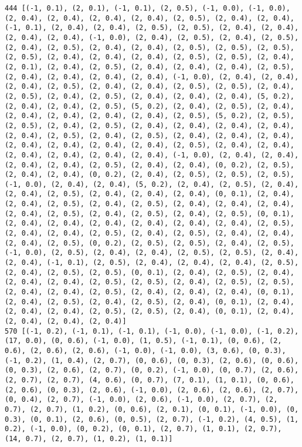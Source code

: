 \documentclass[11pt]{article}
\begin{document}
\begin{Verbatim}[commandchars=\\\{\}]
444 [(-1, 0.1), (2, 0.1), (-1, 0.1), (2, 0.5), (-1, 0.0), (-1, 0.0), (2, 0.4), (2, 0.4), (2, 0.4), (2, 0.4), (2, 0.5), (2, 0.4), (2, 0.4), (-1, 0.1), (2, 0.4), (2, 0.4), (2, 0.5), (2, 0.5), (2, 0.4), (2, 0.4), (2, 0.4), (2, 0.4), (-1, 0.0), (2, 0.4), (2, 0.5), (2, 0.4), (2, 0.5), (2, 0.4), (2, 0.5), (2, 0.4), (2, 0.4), (2, 0.5), (2, 0.5), (2, 0.5), (2, 0.5), (2, 0.4), (2, 0.4), (2, 0.4), (2, 0.5), (2, 0.5), (2, 0.4), (2, 0.1), (2, 0.4), (2, 0.5), (2, 0.4), (2, 0.4), (2, 0.4), (2, 0.5), (2, 0.4), (2, 0.4), (2, 0.4), (2, 0.4), (-1, 0.0), (2, 0.4), (2, 0.4), (2, 0.4), (2, 0.5), (2, 0.4), (2, 0.4), (2, 0.5), (2, 0.5), (2, 0.4), (2, 0.5), (2, 0.4), (2, 0.5), (2, 0.4), (2, 0.4), (2, 0.4), (5, 0.2), (2, 0.4), (2, 0.4), (2, 0.5), (5, 0.2), (2, 0.4), (2, 0.5), (2, 0.4), (2, 0.4), (2, 0.4), (2, 0.4), (2, 0.4), (2, 0.5), (5, 0.2), (2, 0.5), (2, 0.5), (2, 0.4), (2, 0.5), (2, 0.4), (2, 0.4), (2, 0.4), (2, 0.4), (2, 0.4), (2, 0.5), (2, 0.4), (2, 0.5), (2, 0.4), (2, 0.4), (2, 0.4), (2, 0.4), (2, 0.4), (2, 0.4), (2, 0.4), (2, 0.5), (2, 0.4), (2, 0.4), (2, 0.4), (2, 0.4), (2, 0.4), (2, 0.4), (-1, 0.0), (2, 0.4), (2, 0.4), (2, 0.4), (2, 0.4), (2, 0.5), (2, 0.4), (2, 0.4), (0, 0.2), (2, 0.5), (2, 0.4), (2, 0.4), (0, 0.2), (2, 0.4), (2, 0.5), (2, 0.5), (2, 0.5), (-1, 0.0), (2, 0.4), (2, 0.4), (5, 0.2), (2, 0.4), (2, 0.5), (2, 0.4), (2, 0.4), (2, 0.5), (2, 0.4), (2, 0.4), (2, 0.4), (0, 0.1), (2, 0.4), (2, 0.4), (2, 0.5), (2, 0.4), (2, 0.5), (2, 0.4), (2, 0.4), (2, 0.4), (2, 0.4), (2, 0.5), (2, 0.4), (2, 0.5), (2, 0.4), (2, 0.5), (0, 0.1), (2, 0.4), (2, 0.4), (2, 0.4), (2, 0.4), (2, 0.4), (2, 0.4), (2, 0.5), (2, 0.4), (2, 0.4), (2, 0.5), (2, 0.4), (2, 0.5), (2, 0.4), (2, 0.4), (2, 0.4), (2, 0.5), (0, 0.2), (2, 0.5), (2, 0.5), (2, 0.4), (2, 0.5), (-1, 0.0), (2, 0.5), (2, 0.4), (2, 0.4), (2, 0.5), (2, 0.5), (2, 0.4), (2, 0.4), (-1, 0.1), (2, 0.5), (2, 0.4), (2, 0.4), (2, 0.4), (2, 0.5), (2, 0.4), (2, 0.5), (2, 0.5), (0, 0.1), (2, 0.4), (2, 0.5), (2, 0.4), (2, 0.4), (2, 0.4), (2, 0.5), (2, 0.5), (2, 0.4), (2, 0.5), (2, 0.5), (2, 0.4), (2, 0.4), (2, 0.5), (2, 0.4), (2, 0.4), (2, 0.4), (0, 0.1), (2, 0.4), (2, 0.5), (2, 0.4), (2, 0.5), (2, 0.4), (0, 0.1), (2, 0.4), (2, 0.4), (2, 0.4), (2, 0.5), (2, 0.5), (2, 0.4), (0, 0.1), (2, 0.4), (2, 0.4), (2, 0.4), (2, 0.4)]
570 [(-1, 0.2), (-1, 0.1), (-1, 0.1), (-1, 0.0), (-1, 0.0), (-1, 0.2), (17, 0.0), (0, 0.6), (-1, 0.0), (1, 0.5), (-1, 0.1), (0, 0.6), (2, 0.6), (2, 0.6), (2, 0.6), (-1, 0.0), (-1, 0.0), (3, 0.6), (0, 0.3), (-1, 0.2), (1, 0.4), (2, 0.7), (0, 0.6), (0, 0.3), (2, 0.6), (0, 0.6), (0, 0.3), (2, 0.6), (2, 0.7), (0, 0.2), (-1, 0.0), (0, 0.7), (2, 0.6), (2, 0.7), (2, 0.7), (4, 0.6), (0, 0.7), (7, 0.1), (1, 0.1), (0, 0.6), (2, 0.6), (0, 0.3), (2, 0.6), (-1, 0.0), (2, 0.6), (2, 0.6), (2, 0.7), (0, 0.4), (2, 0.7), (-1, 0.0), (2, 0.6), (-1, 0.0), (2, 0.7), (2, 0.7), (2, 0.7), (1, 0.2), (0, 0.6), (2, 0.1), (0, 0.1), (-1, 0.0), (0, 0.3), (0, 0.1), (2, 0.6), (0, 0.5), (2, 0.7), (-1, 0.2), (4, 0.5), (1, 0.2), (-1, 0.0), (0, 0.2), (0, 0.1), (2, 0.7), (1, 0.1), (2, 0.7), (14, 0.7), (2, 0.7), (1, 0.2), (1, 0.1)]

\end{Verbatim}
\end{document}
